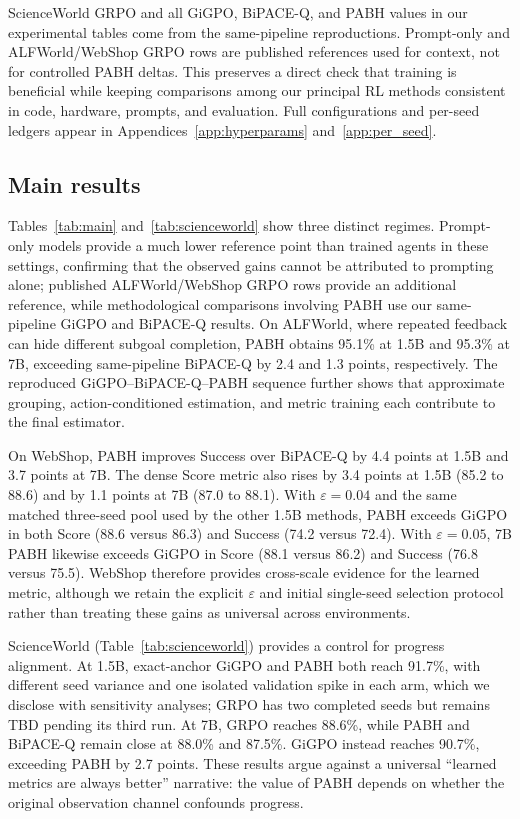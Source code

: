 \documentclass[10pt,twocolumn,letterpaper]{article}
\newcommand{\method}{PABH\xspace}
\newcommand{\TBD}{\textcolor{red!60!black}{TBD}}
\begin{document}
ScienceWorld GRPO and all GiGPO, BiPACE-Q, and \method values in our experimental tables come from the same-pipeline reproductions. Prompt-only and ALFWorld/WebShop GRPO rows are published references used for context, not for controlled \method deltas. This preserves a direct check that training is beneficial while keeping comparisons among our principal RL methods consistent in code, hardware, prompts, and evaluation. Full configurations and per-seed ledgers appear in Appendices~\ref{app:hyperparams} and~\ref{app:per_seed}.



\subsection{Main results}
\label{sec:main}
Tables~\ref{tab:main} and~\ref{tab:scienceworld} show three distinct regimes. Prompt-only models provide a much lower reference point than trained agents in these settings, confirming that the observed gains cannot be attributed to prompting alone; published ALFWorld/WebShop GRPO rows provide an additional reference, while methodological comparisons involving \method use our same-pipeline GiGPO and BiPACE-Q results. On ALFWorld, where repeated feedback can hide different subgoal completion, \method obtains 95.1\% at 1.5B and 95.3\% at 7B, exceeding same-pipeline BiPACE-Q by 2.4 and 1.3 points, respectively. The reproduced GiGPO--BiPACE-Q--\method sequence further shows that approximate grouping, action-conditioned estimation, and metric training each contribute to the final estimator.

On WebShop, \method improves Success over BiPACE-Q by 4.4 points at 1.5B and 3.7 points at 7B. The dense Score metric also rises by 3.4 points at 1.5B (85.2 to 88.6) and by 1.1 points at 7B (87.0 to 88.1). With $\varepsilon=0.04$ and the same matched three-seed pool used by the other 1.5B methods, \method exceeds GiGPO in both Score (88.6 versus 86.3) and Success (74.2 versus 72.4). With $\varepsilon=0.05$, 7B \method likewise exceeds GiGPO in Score (88.1 versus 86.2) and Success (76.8 versus 75.5). WebShop therefore provides cross-scale evidence for the learned metric, although we retain the explicit $\varepsilon$ and initial single-seed selection protocol rather than treating these gains as universal across environments.

ScienceWorld (Table~\ref{tab:scienceworld}) provides a control for progress alignment. At 1.5B, exact-anchor GiGPO and \method both reach 91.7\%, with different seed variance and one isolated validation spike in each arm, which we disclose with sensitivity analyses; GRPO has two completed seeds but remains \TBD{} pending its third run. At 7B, GRPO reaches 88.6\%, while \method and BiPACE-Q remain close at 88.0\% and 87.5\%. GiGPO instead reaches 90.7\%, exceeding \method by 2.7 points. These results argue against a universal ``learned metrics are always better'' narrative: the value of \method depends on whether the original observation channel confounds progress.
\end{document}
